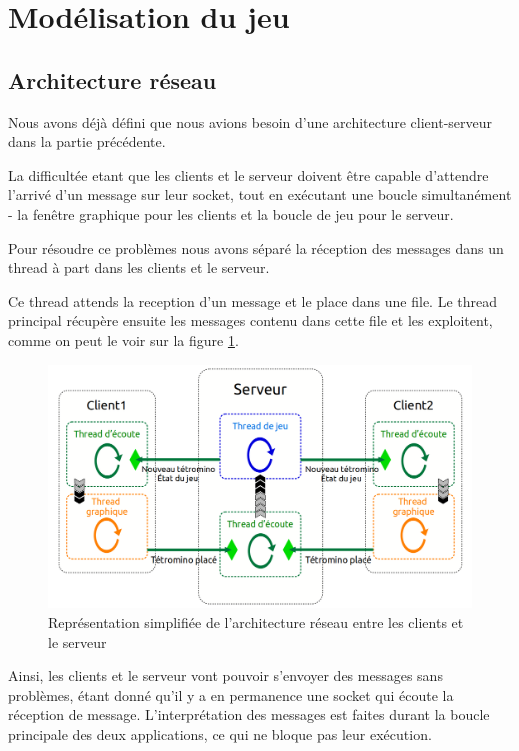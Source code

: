 \documentclass[a4paper, 12pt]{article}
\begin{document}
	\section{Modélisation du jeu}

		\subsection{Architecture réseau}

			Nous avons déjà défini que nous avions besoin d'une architecture client-serveur dans la partie précédente.

			La difficultée etant que les clients et le serveur doivent être capable d'attendre l'arrivé d'un message sur leur socket, tout en exécutant une boucle simultanément - la fenêtre graphique pour les clients et la boucle de jeu pour le serveur.


			Pour résoudre ce problèmes nous avons séparé la réception des messages dans un thread à part dans les clients et le serveur.

			Ce thread attends la reception d'un message et le place dans une file. Le thread principal récupère ensuite les messages contenu dans cette file et les exploitent, comme on peut le voir sur la figure \ref{fig:rezo}.

			\begin{figure}[bt]
				\centering
				\includegraphics[scale=0.35]{img/archi_reseau.png}
				\caption{Représentation simplifiée de l'architecture réseau entre les clients et le serveur}
				\label{fig:rezo}
			\end{figure}

			Ainsi, les clients et le serveur vont pouvoir s'envoyer des messages sans problèmes, étant donné qu'il y a en permanence une socket qui écoute la réception de message. L'interprétation des messages est faites durant la boucle principale des deux applications, ce qui ne bloque pas leur exécution.
\end{document}
